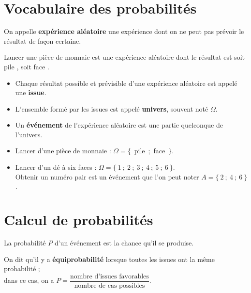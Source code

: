 \section{Vocabulaire des probabilités} %

\begin{definition}
   On appelle \textbf{expérience aléatoire} une expérience dont on ne peut pas prévoir le résultat de façon certaine.
\end{definition}

\begin{exemple*1}
   Lancer une pièce de monnaie est une expérience aléatoire dont le résultat est soit \og pile \fg, soit \og face \fg.
\end{exemple*1}

\begin{vocabulaire}
   \begin{itemize}
      \item Chaque résultat possible et prévisible d'une expérience aléatoire est appelé une \textbf{issue}.
      \item L'ensemble formé par les issues est appelé \textbf{univers}, souvent noté $\Omega$.
      \item Un \textbf{événement} de l'expérience aléatoire est une partie quelconque de l'univers.
   \end{itemize}
\end{vocabulaire}

\begin{exemple*1}
   \begin{itemize}
      \item Lancer d'une pièce de monnaie : $\Omega =\{$~pile~;~face~$\}$.
      \item Lancer d'un dé à six faces : $\Omega =\{~1~;~2~;~3~;~4~;~5~;~6~\}$. \\
      \og Obtenir un numéro pair \fg{} est un événement que l'on peut noter $A=\{~2~;~4~;~6~\}$.
   \end{itemize}
   \vspace*{-5mm}
\end{exemple*1}


\section{Calcul de probabilités} %

La probabilité $P$ d'un événement est \og la chance \fg{} qu'il se produise.

\begin{definition}
   On dit qu'il y a \textbf{équiprobabilité} lorsque toutes les issues ont la même probabilité ; \\ [0.5mm]
   dans ce cas, on a $P=\dfrac{\textrm{nombre d'issues favorables}}{\textrm{nombre de cas possibles}}$.
\end{definition}

